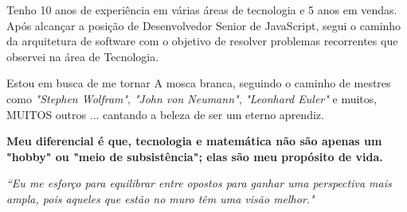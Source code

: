 

\begin{cvparagraph}

\vspace{2mm}

Tenho 10 anos de experiência em várias áreas de tecnologia e 5 anos em vendas. 
Após alcançar a posição de Desenvolvedor Senior de JavaScript, segui o caminho da arquitetura de software com o objetivo de resolver problemas recorrentes que observei na área de Tecnologia. \par
Estou em busca de me tornar A mosca branca, seguindo o caminho de mestres como \textit{"Stephen Wolfram"}, \textit{"John von Neumann"}, \textit{"Leonhard Euler"} e muitos, MUITOS outros ... cantando a beleza de ser um eterno aprendiz.\par
\textbf{Meu diferencial é que, tecnologia e matemática não são apenas um "hobby" ou "meio de subsistência"; elas são meu propósito de vida.}\par
\begin{flushright}
	\textit{``Eu me esforço para equilibrar entre opostos para ganhar uma perspectiva mais ampla, pois aqueles que estão no muro têm uma visão melhor."}
\end{flushright}


    
\end{cvparagraph}
